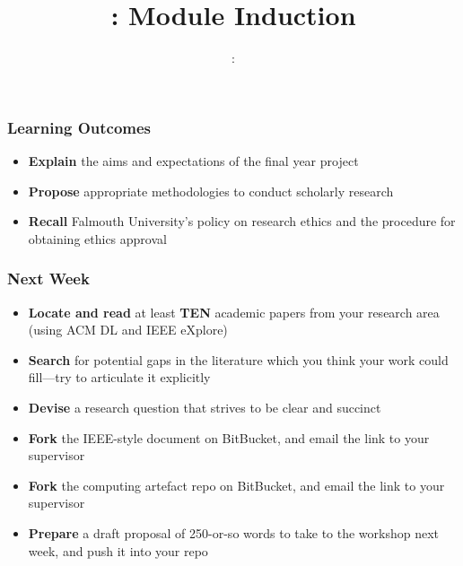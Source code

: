 \usepackage{../../beamerthemeFalmouthGamesAcademy}
\usepackage{multimedia}
\graphicspath{ {../../} }


\usepackage[normalem]{ulem}
\usepackage{wasysym}

\usepackage{algpseudocode}

\usepackage{pdfpages}

\usepackage{fancyvrb}

\usetikzlibrary{arrows,automata}



\title{\sessionnumber: Module Induction}
\subtitle{\modulecode: \moduletitle}

\frame{\titlepage} 

\begin{frame}
	\frametitle{Learning Outcomes}
	\begin{itemize}
		\item \textbf{Explain} the aims and expectations of the final year project
		\item \textbf{Propose} appropriate methodologies to conduct scholarly research
		\item \textbf{Recall} Falmouth University's policy on research ethics and the procedure for obtaining ethics approval
	\end{itemize}
\end{frame}





\begin{frame}
	\frametitle{Next Week}
	\begin{itemize}
		\item \textbf{Locate and read} at least \textbf{TEN} academic papers from your research area (using ACM DL and IEEE eXplore)
		\item \textbf{Search} for potential gaps in the literature which you think your work could fill---try to articulate it explicitly
		\item \textbf{Devise} a research question that strives to be clear and succinct
		\item \textbf{Fork} the IEEE-style document on BitBucket, and email the link to your supervisor
		\item \textbf{Fork} the computing artefact repo on BitBucket, and email the link to your supervisor
		\item \textbf{Prepare} a draft proposal of 250-or-so words to take to the workshop next week, and push it into your repo	
	\end{itemize}
\end{frame}


